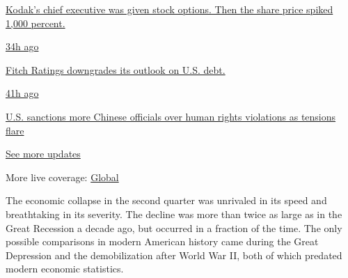 \href{https://www.nytimes.com/live/2020/07/31/business/stock-market-today-coronavirus?action=click\&pgtype=Article\&state=default\&region=MAIN_CONTENT_1\&context=storylines_live_updates\#kodaks-chief-executive-was-given-stock-options-then-the-share-price-spiked-1000-percent}{Kodak's
chief executive was given stock options. Then the share price spiked
1,000 percent.}

\href{https://www.nytimes.com/live/2020/07/31/business/stock-market-today-coronavirus?action=click\&pgtype=Article\&state=default\&region=MAIN_CONTENT_1\&context=storylines_live_updates\#fitch-ratings-downgrades-its-outlook-on-us-debt}{34h
ago}

\href{https://www.nytimes.com/live/2020/07/31/business/stock-market-today-coronavirus?action=click\&pgtype=Article\&state=default\&region=MAIN_CONTENT_1\&context=storylines_live_updates\#fitch-ratings-downgrades-its-outlook-on-us-debt}{Fitch
Ratings downgrades its outlook on U.S. debt.}

\href{https://www.nytimes.com/live/2020/07/31/business/stock-market-today-coronavirus?action=click\&pgtype=Article\&state=default\&region=MAIN_CONTENT_1\&context=storylines_live_updates\#us-sanctions-more-chinese-officials-over-human-rights-violations-as-tensions-flare}{41h
ago}

\href{https://www.nytimes.com/live/2020/07/31/business/stock-market-today-coronavirus?action=click\&pgtype=Article\&state=default\&region=MAIN_CONTENT_1\&context=storylines_live_updates\#us-sanctions-more-chinese-officials-over-human-rights-violations-as-tensions-flare}{U.S.
sanctions more Chinese officials over human rights violations as
tensions flare}

\href{https://www.nytimes.com/live/2020/07/31/business/stock-market-today-coronavirus?action=click\&pgtype=Article\&state=default\&region=MAIN_CONTENT_1\&context=storylines_live_updates}{See
more updates}

More live coverage:
\href{https://www.nytimes.com/2020/08/01/world/coronavirus-covid-19.html?action=click\&pgtype=Article\&state=default\&region=MAIN_CONTENT_1\&context=storylines_live_updates}{Global}

The economic collapse in the second quarter was unrivaled in its speed
and breathtaking in its severity. The decline was more than twice as
large as in the Great Recession a decade ago, but occurred in a fraction
of the time. The only possible comparisons in modern American history
came during the Great Depression and the demobilization after World War
II, both of which predated modern economic statistics.

